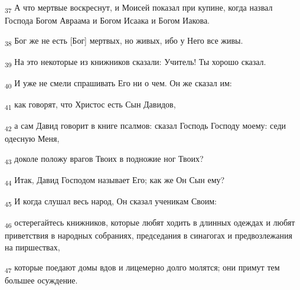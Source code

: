 \begin{tcolorbox}
\textsubscript{37} А что мертвые воскреснут, и Моисей показал при купине, когда назвал Господа Богом Авраама и Богом Исаака и Богом Иакова.
\end{tcolorbox}
\begin{tcolorbox}
\textsubscript{38} Бог же не есть [Бог] мертвых, но живых, ибо у Него все живы.
\end{tcolorbox}
\begin{tcolorbox}
\textsubscript{39} На это некоторые из книжников сказали: Учитель! Ты хорошо сказал.
\end{tcolorbox}
\begin{tcolorbox}
\textsubscript{40} И уже не смели спрашивать Его ни о чем. Он же сказал им:
\end{tcolorbox}
\begin{tcolorbox}
\textsubscript{41} как говорят, что Христос есть Сын Давидов,
\end{tcolorbox}
\begin{tcolorbox}
\textsubscript{42} а сам Давид говорит в книге псалмов: сказал Господь Господу моему: седи одесную Меня,
\end{tcolorbox}
\begin{tcolorbox}
\textsubscript{43} доколе положу врагов Твоих в подножие ног Твоих?
\end{tcolorbox}
\begin{tcolorbox}
\textsubscript{44} Итак, Давид Господом называет Его; как же Он Сын ему?
\end{tcolorbox}
\begin{tcolorbox}
\textsubscript{45} И когда слушал весь народ, Он сказал ученикам Своим:
\end{tcolorbox}
\begin{tcolorbox}
\textsubscript{46} остерегайтесь книжников, которые любят ходить в длинных одеждах и любят приветствия в народных собраниях, председания в синагогах и предвозлежания на пиршествах,
\end{tcolorbox}
\begin{tcolorbox}
\textsubscript{47} которые поедают домы вдов и лицемерно долго молятся; они примут тем большее осуждение.
\end{tcolorbox}
